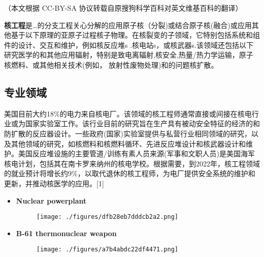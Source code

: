 
（本文根据 CC-BY-SA 协议转载自原搜狗科学百科对英文维基百科的翻译）

\textbf{核工程}是…的分支工程关心分解的应用原子核（分裂)或结合原子核(融合)或应用其他基于以下原理的亚原子过程核子物理。在核裂变的子领域，它特别包括系统和组件的设计、交互和维护，例如核反应堆s .核电站s，或核武器s.该领域还包括以下研究医学的和其他应用辐射，特别是致电离辐射,核安全,热量/热力学运输，原子核燃料、或其他相关技术(例如， 放射性废物处理)和的问题核扩散。

\subsection{专业领域}
美国目前大约18\%的电力来自核电厂。该领域的核工程师通常直接或间接在核电行业或为国家实验室工作。该行业目前的研究旨在生产具有被动安全特征的经济的和防扩散的反应器设计。一些政府(国家)实验室提供与私营行业相同领域的研究，以及其他领域的研究，如核燃料和核燃料循环、先进反应堆设计和核武器设计和维护。美国反应堆设施的主要管道/训练有素人员来源(军事和文职人员)是美国海军核电计划，包括其在南卡罗来纳州的核电学校。根据需要，到2022年，核工程领域的就业预计将增长约9\%，以取代退休的核工程师，为电厂提供安全系统的维护和更新，并推动核医学的应用。[1]
\begin{itemize}
\item \textbf{Nuclear powerplant}
\begin{figure}[ht]
\centering
\texttt{[image: ./figures/dfb28eb7dddcb2a2.png]}
\caption \label{fig_HGC_1}
\end{figure}
\item \textbf{B-61 thermonuclear weapon}
\begin{figure}[ht]
\centering
\texttt{[image: ./figures/a7b4abdc22df4471.png]}
\caption\label{fig_HGC_2}
\end{figure}
\end{itemize}

